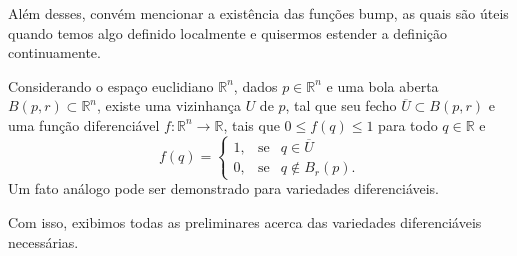 Além desses, convém mencionar a existência das funções bump, as quais são úteis quando temos algo definido localmente e quisermos estender a definição continuamente.
\begin{lemma}
    \label{loc:def_11_:_funções_bump}
    Considerando o espaço euclidiano $\mathbb{R}^{n}$, dados $p \in \mathbb{R}^{n}$ e uma bola aberta $B(p, r) \subset \mathbb{R}^{n}$, existe uma vizinhança $U$ de $p$, tal que seu fecho $\overline{U} \subset B(p, r)$ e uma função diferenciável $f:\mathbb{R}^{n}\to \mathbb{R}$, tais que $0\leq f(q)\leq1$ para todo $q \in \mathbb{R}$ e
    \begin{equation*}
        f(q)=\left\{\begin{array}{lcl}
            1, & \mbox{se} & q \in \overline{U} \\
            0, & \mbox{se} & q \notin B_{r}(p).
        \end{array}\right.
    \end{equation*}
    Um fato análogo pode ser demonstrado para variedades diferenciáveis.
\end{lemma}
Com isso, exibimos todas as preliminares acerca das variedades diferenciáveis necessárias.